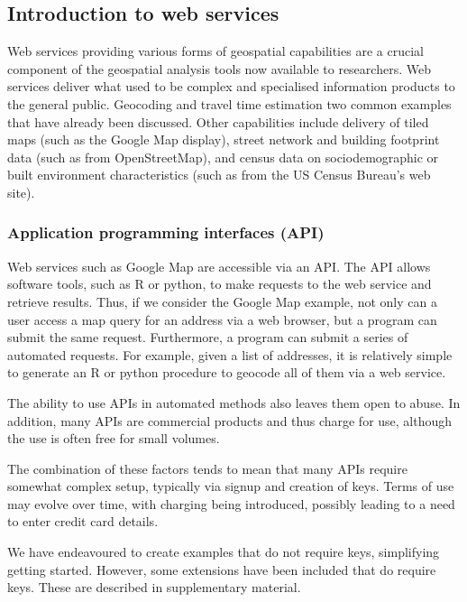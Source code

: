 \documentclass[utf8]{frontiersHLTH}
\begin{document}
\hypertarget{introduction-to-web-services}{%
\subsection{Introduction to web
services}\label{introduction-to-web-services}}

Web services providing various forms of geospatial capabilities are a
crucial component of the geospatial analysis tools now available to
researchers. Web services deliver what used to be complex and
specialised information products to the general public. Geocoding and
travel time estimation two common examples that have already been
discussed. Other capabilities include delivery of tiled maps (such as
the Google Map display), street network and building footprint data
(such as from OpenStreetMap), and census data on sociodemographic or
built environment characteristics (such as from the US Census Bureau's
web site).

\subsubsection{Application programming interfaces
(API)}\label{application-programming-interfaces-api}

Web services such as Google Map are accessible via an API. The API allows software tools,
such as R or python, to make requests to the web service and retrieve
results. Thus, if we consider the Google Map example, not only can a
user access a map query for an address via a web browser, but a program
can submit the same request. Furthermore, a program can submit a series
of automated requests. For example, given a list of addresses, it is
relatively simple to generate an R or python procedure to geocode all of
them via a web service.

The ability to use APIs in automated methods also leaves them open to
abuse. In addition, many APIs are commercial products and thus charge
for use, although the use is often free for small volumes.

The combination of these factors tends to mean that many APIs require
somewhat complex setup, typically via signup and creation of keys. Terms
of use may evolve over time, with charging being introduced, possibly
leading to a need to enter credit card details.

We have endeavoured to create examples that do not require keys,
simplifying getting started. However, some extensions have been included
that do require keys. These are described in supplementary material.
\end{document}

